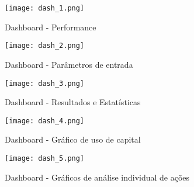 \begin{figure}[h]
    \texttt{[image: dash\_1.png]}
    \centering
    \caption{Dashboard - Performance}
    \label{fig:171}
\end{figure}

\begin{figure}[h]
    \texttt{[image: dash\_2.png]}
    \centering
    \caption{Dashboard - Parâmetros de entrada}
    \label{fig:172}
\end{figure}

\begin{figure}[h]
    \texttt{[image: dash\_3.png]}
    \centering
    \caption{Dashboard - Resultados e Estatísticas}
    \label{fig:173}
\end{figure}

\begin{figure}[h]
    \texttt{[image: dash\_4.png]}
    \centering
    \caption{Dashboard - Gráfico de uso de capital}
    \label{fig:174}
\end{figure}

\begin{figure}[h]
    \texttt{[image: dash\_5.png]}
    \centering
    \caption{Dashboard - Gráficos de análise individual de ações }
    \label{fig:175}
\end{figure}